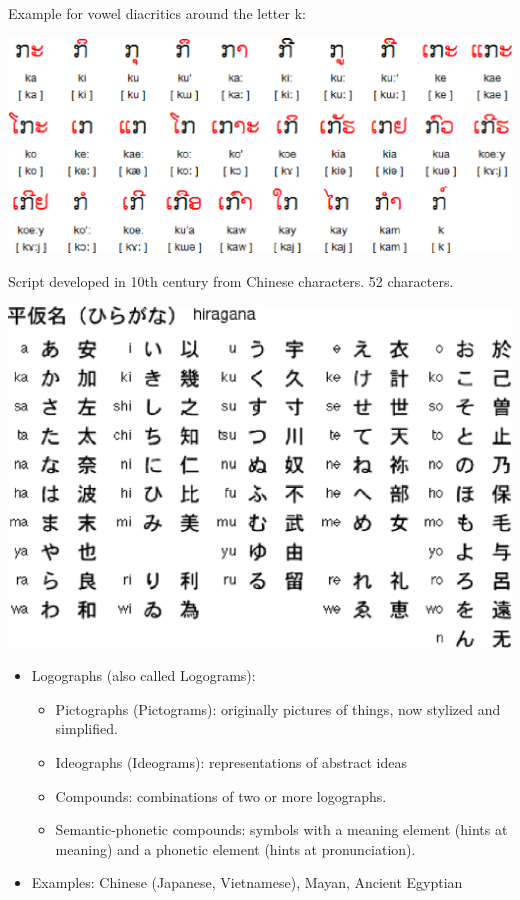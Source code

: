 \documentclass[a4paper,landscape,headrule,footrule,xetex]{foils}
\begin{document}
Example for vowel diacritics around the letter k:

\includegraphics{../pics/lao_vwl.eps}


Script developed in 10th century from Chinese characters. 52 characters.

\begin{center}
  \includegraphics{../pics/hiragana.eps}
\end{center}
\begin{itemize}
\item Logographs (also called Logograms):
\begin{itemize}
\item Pictographs (Pictograms): originally pictures of things, now stylized and simplified.
\item Ideographs (Ideograms): representations of abstract ideas
\item Compounds: combinations of two or more logographs.
\item Semantic-phonetic compounds: symbols with a meaning element (hints at meaning) and a phonetic element (hints at pronunciation).
\end{itemize}

\item Examples: Chinese (Japanese, Vietnamese), Mayan, Ancient Egyptian
\end{itemize}
\end{document}
